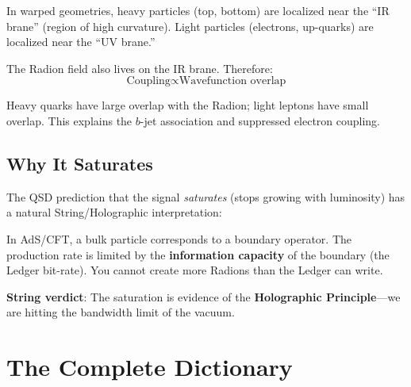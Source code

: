 \documentclass[11pt,a4paper]{article}
\theoremstyle{definition}
\begin{document}
In warped geometries, heavy particles (top, bottom) are localized near the ``IR brane'' (region of high curvature). Light particles (electrons, up-quarks) are localized near the ``UV brane.''

The Radion field also lives on the IR brane. Therefore:
\begin{equation}
\text{Coupling} \propto \text{Wavefunction overlap}
\end{equation}

Heavy quarks have large overlap with the Radion; light leptons have small overlap. This explains the $b$-jet association and suppressed electron coupling.

\subsection{Why It Saturates}

The QSD prediction that the signal \emph{saturates} (stops growing with luminosity) has a natural String/Holographic interpretation:

In AdS/CFT, a bulk particle corresponds to a boundary operator. The production rate is limited by the \textbf{information capacity} of the boundary (the Ledger bit-rate). You cannot create more Radions than the Ledger can write.

\textbf{String verdict}: The saturation is evidence of the \textbf{Holographic Principle}---we are hitting the bandwidth limit of the vacuum.

\section{The Complete Dictionary}
\label{sec:dictionary}
\end{document}
